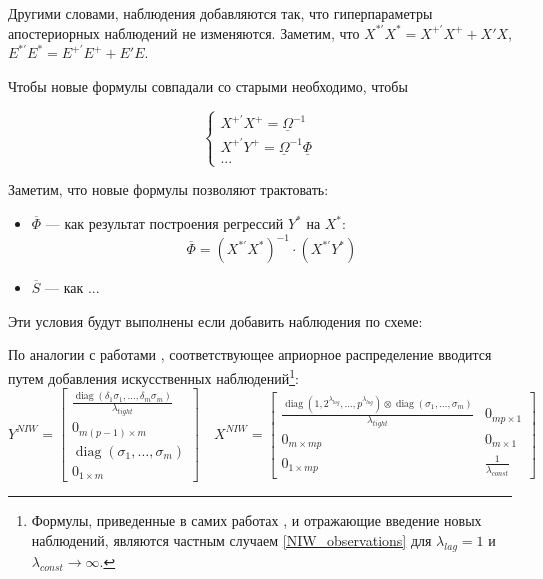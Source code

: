 \documentclass[11pt]{article} %
\DeclareMathOperator{\diag}{diag}
\newcommand{\prior}{\underline}
\newcommand{\post}{\overline}
\let\vec\relax
\DeclareMathOperator{\vec}{vec}
\begin{document}

Другими словами, наблюдения добавляются так, что гиперпараметры апостериорных наблюдений не изменяются. Заметим, что $X^{*\prime}X^*=X^{+\prime}X^+ + X'X$, $E^{*\prime}E^*=E^{+\prime}E^+ + E'E$.

Чтобы новые формулы совпадали со старыми необходимо, чтобы

\begin{equation}
\begin{cases}
X^{+\prime}X^+=\prior \Omega^{-1} \\
X^{+\prime}Y^+=\prior \Omega^{-1}\prior \Phi \\
...
\end{cases}
\end{equation}







Заметим, что новые формулы позволяют трактовать:
\begin{itemize}
\item $\post \Phi$ --- как результат построения регрессий $Y^*$ на $X^*$:
\[
\post \Phi=(X^{*\prime}X^*)^{-1}\cdot (X^{*\prime}Y^*)
\]
\item $\post S$ --- как ...
\end{itemize}




Эти условия будут выполнены если добавить наблюдения по схеме:

По аналогии с  работами  \cite{banbura_al_2010}, \cite{berg_henzel_2013} соответствующее априорное распределение вводится путем добавления искусственных наблюдений\footnote{Формулы, приведенные в самих работах \cite{banbura_al_2010}, \cite{berg_henzel_2013} и отражающие введение новых наблюдений, являются частным случаем \eqref{NIW_observations} для $\lambda_{lag}=1$ и $\lambda_{const}\to\infty$.}:
\begin{equation}
Y^{NIW}=\begin{bmatrix}
\frac{\diag(\delta_1\sigma_1,\ldots, \delta_m\sigma_m)}{\lambda_{tight}}\\
0_{m(p-1)\times m}\\
\diag(\sigma_1,\ldots,\sigma_m)\\
0_{1\times m}
\end{bmatrix}
\quad
%
X^{NIW}=\begin{bmatrix}
\frac{\diag(1,2^{\lambda_{lag}},\ldots, p^{\lambda_{lag}})\otimes \diag(\sigma_1,\ldots,\sigma_m)}{\lambda_{tight}} & 0_{mp\times 1} \\
0_{m\times mp}&0_{m\times 1}\\
0_{1\times mp}&\frac{1}{\lambda_{const}}
\end{bmatrix}\label{NIW_observations}
\end{equation}
\end{document}
